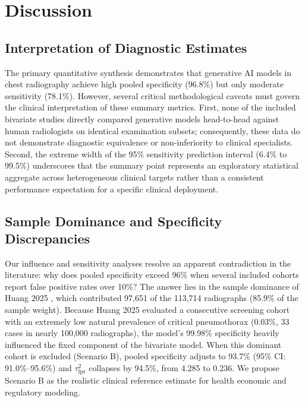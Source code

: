 \documentclass[preprint,11pt]{elsarticle}
\begin{document}
\section{Discussion}

\subsection{Interpretation of Diagnostic Estimates}
The primary quantitative synthesis demonstrates that generative AI models in chest radiography achieve high pooled specificity (96.8\%) but only moderate sensitivity (78.1\%). However, several critical methodological caveats must govern the clinical interpretation of these summary metrics. First, none of the included bivariate studies directly compared generative models head-to-head against human radiologists on identical examination subsets; consequently, these data do not demonstrate diagnostic equivalence or non-inferiority to clinical specialists. Second, the extreme width of the 95\% sensitivity prediction interval (6.4\% to 99.5\%) underscores that the summary point represents an exploratory statistical aggregate across heterogeneous clinical targets rather than a consistent performance expectation for a specific clinical deployment.

\subsection{Sample Dominance and Specificity Discrepancies}
Our influence and sensitivity analyses resolve an apparent contradiction in the literature: why does pooled specificity exceed 96\% when several included cohorts report false positive rates over 10\%? The answer lies in the sample dominance of Huang 2025 \cite{huang2025}, which contributed 97,651 of the 113,714 radiographs (85.9\% of the sample weight). Because Huang 2025 evaluated a consecutive screening cohort with an extremely low natural prevalence of critical pneumothorax (0.03\%, 33 cases in nearly 100,000 radiographs), the model's 99.98\% specificity heavily influenced the fixed component of the bivariate model. When this dominant cohort is excluded (Scenario B), pooled specificity adjusts to 93.7\% (95\% CI: 91.0\%--95.6\%) and $\tau^2_{\text{fpr}}$ collapses by 94.5\%, from 4.285 to 0.236. We propose Scenario B as the realistic clinical reference estimate for health economic and regulatory modeling.
\end{document}
